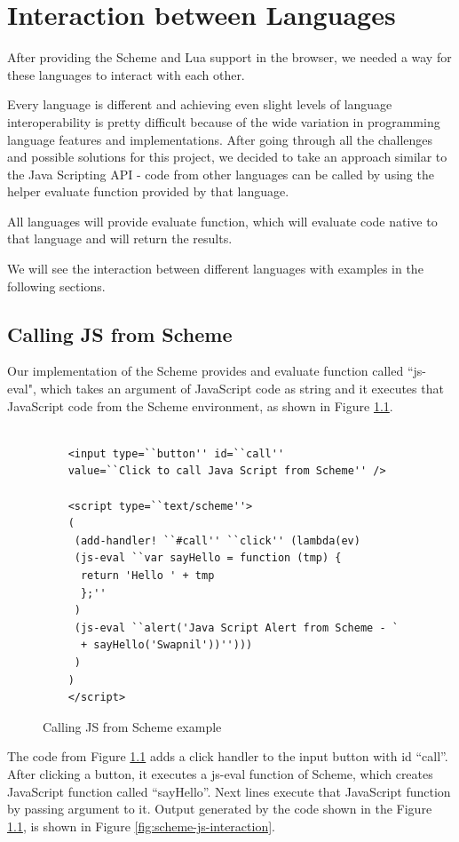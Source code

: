 \chapter{Interaction between Languages} \label{interaction}

After providing the Scheme and Lua support in the browser, we needed a way for these languages to interact with each other. 

Every language is different and achieving even slight levels of language interoperability is pretty difficult because of the wide variation in programming language features and implementations. After going through all the challenges and possible solutions for this project, we decided to take an approach similar to the Java Scripting API \cite{Juneau2017} - code from other languages can be called by using the helper evaluate function provided by that language.

All languages will provide evaluate function, which will evaluate code native to that language and will return the results.

We will see the interaction between different languages with examples in the following sections.

\section{Calling JS from Scheme}

Our implementation of the Scheme provides and evaluate function called ``js-eval", which takes an argument of JavaScript code as string and it executes that JavaScript code from the Scheme environment, as shown in Figure \ref{fig:jsfromscheme}.

\begin{figure}[H]
	\begin{lstlisting}
	
	<input type=``button'' id=``call'' 
	value=``Click to call Java Script from Scheme'' />
	
	<script type=``text/scheme''>
	(
	 (add-handler! ``#call'' ``click'' (lambda(ev)
	 (js-eval ``var sayHello = function (tmp) {
	  return 'Hello ' + tmp
	  };''
	 )
	 (js-eval ``alert('Java Script Alert from Scheme - ` 
	  + sayHello('Swapnil'))'')))
	 )
	)
	</script>
	\end{lstlisting}
	\caption{Calling JS from Scheme example}
	\label{fig:jsfromscheme}
\end{figure}

The code from Figure \ref{fig:jsfromscheme} adds a click handler to the input button with id ``call''. After clicking a button, it executes a js-eval function of Scheme, which creates JavaScript function called ``sayHello''.  Next lines execute that JavaScript function by passing argument to it.  Output generated by the code shown in the Figure \ref{fig:jsfromscheme}, is shown in Figure \ref{fig:scheme-js-interaction}.

